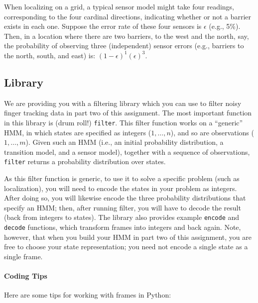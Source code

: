 \documentclass{article}
\begin{document}
When localizing on a grid, a typical sensor model might take four readings,
corresponding to the four cardinal directions,
indicating whether or not a barrier exists in each one.
Suppose the error rate of these four sensors is $\epsilon$ (e.g., 5\%).
Then, in a location where there are two barriers, to the west and the north, say,
the probability of observing three (independent) sensor errors
(e.g., barriers to the north, south, and east) is:
$(1 - \epsilon)^1 (\epsilon)^3$.
\fi


\subsection{Library}
\label{sec:library}

We are providing you with a filtering library which you can use to
filter noisy finger tracking data in part two of this assignment.  The
most important function in this library is (drum roll!) \verb|filter|.
This filter function works on a ``generic'' HMM, in which states are
specified as integers ($1, \ldots, n$), and so are observations ($1,
\ldots, m$).  Given such an HMM (i.e., an initial probability
distribution, a transition model, and a sensor model), together with a
sequence of observations, \verb|filter| returns a probability
distribution over states.

As this filter function is generic, to use it to solve a specific
problem (such as localization), you will need to encode the states in
your problem as integers.  After doing so, you will likewise encode
the three probability distributions that specify an HMM; then, after
running filter, you will have to decode the result (back from integers
to states).  The library also provides example \verb|encode| and
\verb|decode| functions, which transform frames into integers and back
again.  Note, however, that when you build your HMM in part two of
this assignment, you are free to choose your state representation; you
need not encode a single state as a single frame.

\paragraph{Coding Tips}
Here are some tips for working with frames in Python:
\end{document}

